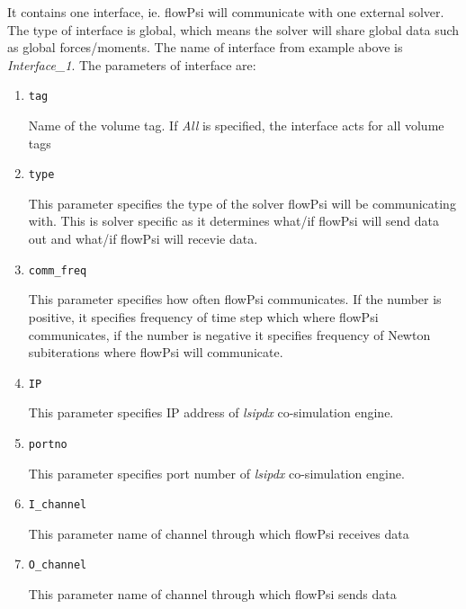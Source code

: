 \documentclass{article}
\begin{document}
It contains one interface, ie. flowPsi will communicate with one external solver. The type of interface is global, 
which means the solver will share global data such as global forces/moments. The name of interface from example above
is \emph{Interface\_1}. The parameters of interface are:
\begin{enumerate}

\item {\tt tag}

Name of the volume tag. If \emph{All} is specified, the interface acts for all volume tags

\item {\tt type}

This parameter specifies the type of the solver flowPsi will be communicating with. This is solver specific as it 
determines what/if flowPsi will send data out and what/if flowPsi will recevie data. 

\item {\tt comm\_freq}

This parameter specifies how often flowPsi communicates. If the number is positive, it specifies frequency of time step
which where flowPsi communicates, if the number is negative it specifies frequency of 
Newton subiterations where flowPsi will communicate.

\item {\tt IP}

This parameter specifies IP address of \emph{lsipdx} co-simulation engine.

\item {\tt portno}

This parameter specifies port number of \emph{lsipdx} co-simulation engine.

\item {\tt I\_channel}

This parameter name of channel through which flowPsi receives data

\item {\tt O\_channel}

This parameter name of channel through which flowPsi sends data


\end{enumerate}
\end{document}
